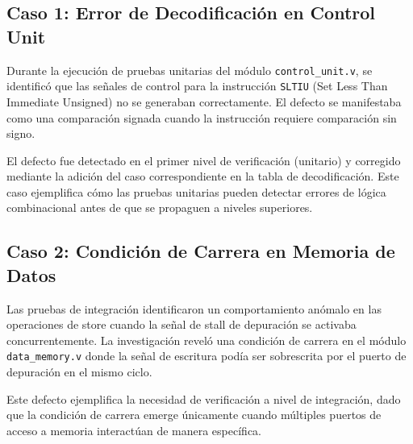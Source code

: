 \subsection{Caso 1: Error de Decodificación en Control Unit}
Durante la ejecución de pruebas unitarias del módulo \texttt{control\_unit.v}, se identificó que las señales de control para la instrucción \texttt{SLTIU} (Set Less Than Immediate Unsigned) no se generaban correctamente. El defecto se manifestaba como una comparación signada cuando la instrucción requiere comparación sin signo.

El defecto fue detectado en el primer nivel de verificación (unitario) y corregido mediante la adición del caso correspondiente en la tabla de decodificación. Este caso ejemplifica cómo las pruebas unitarias pueden detectar errores de lógica combinacional antes de que se propaguen a niveles superiores.

\subsection{Caso 2: Condición de Carrera en Memoria de Datos}
Las pruebas de integración identificaron un comportamiento anómalo en las operaciones de store cuando la señal de stall de depuración se activaba concurrentemente. La investigación reveló una condición de carrera en el módulo \texttt{data\_memory.v} donde la señal de escritura podía ser sobrescrita por el puerto de depuración en el mismo ciclo.

Este defecto ejemplifica la necesidad de verificación a nivel de integración, dado que la condición de carrera emerge únicamente cuando múltiples puertos de acceso a memoria interactúan de manera específica.

\chapterend{}
